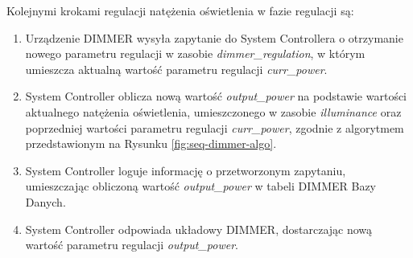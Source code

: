             Kolejnymi krokami regulacji natężenia oświetlenia w fazie regulacji są:
            \begin{enumerate}
                \item Urządzenie DIMMER wysyła zapytanie do System Controllera o otrzymanie nowego parametru regulacji w zasobie \textit{dimmer\_regulation}, w którym umieszcza aktualną wartość parametru regulacji \textit{curr\_power}.
                \item System Controller oblicza nową wartość \textit{output\_power} na podstawie wartości aktualnego natężenia oświetlenia, umieszczonego w zasobie \textit{illuminance} oraz poprzedniej wartości parametru regulacji \textit{curr\_power}, zgodnie z algorytmem przedstawionym na Rysunku \ref{fig:seq-dimmer-algo}.
                \item System Controller loguje informację o przetworzonym zapytaniu, umieszczając obliczoną wartość \textit{output\_power} w tabeli DIMMER Bazy Danych.
                \item System Controller odpowiada układowy DIMMER, dostarczając nową wartość parametru regulacji \textit{output\_power}.
            \end{enumerate}

